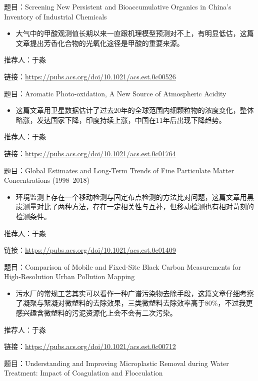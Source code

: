\documentclass[]{book}
\providecommand{\tightlist}{%
  \setlength{\itemsep}{0pt}\setlength{\parskip}{0pt}}
\begin{document}
题目：Screening New Persistent and Bioaccumulative Organics in China's Inventory of Industrial Chemicals

\begin{itemize}
\tightlist
\item
  大气中的甲酸观测值长期以来一直跟机理模型预测对不上，有明显低估，这篇文章提出芳香化合物的光氧化途径是甲酸的重要来源。
\end{itemize}

推荐人：于淼

链接：\url{https://pubs.acs.org/doi/10.1021/acs.est.0c00526}

题目：Aromatic Photo-oxidation, A New Source of Atmospheric Acidity

\begin{itemize}
\tightlist
\item
  这篇文章用卫星数据估计了过去20年的全球范围内细颗粒物的浓度变化，整体略涨，发达国家下降，印度持续上涨，中国在11年后出现下降趋势。
\end{itemize}

推荐人：于淼

链接：\url{https://pubs.acs.org/doi/10.1021/acs.est.0c01764}

题目：Global Estimates and Long-Term Trends of Fine Particulate Matter Concentrations (1998--2018)

\begin{itemize}
\tightlist
\item
  环境监测上存在一个移动检测与固定布点检测的方法比对问题，这篇文章用黑炭测量对比了两种方法，存在一定相关性与互补，但移动检测也有相对苛刻的检测条件。
\end{itemize}

推荐人：于淼

链接：\url{https://pubs.acs.org/doi/10.1021/acs.est.0c01409}

题目：Comparison of Mobile and Fixed-Site Black Carbon Measurements for High-Resolution Urban Pollution Mapping

\begin{itemize}
\tightlist
\item
  污水厂的常规工艺其实可以看作一种广谱污染物去除手段，这篇文章仔细考察了凝聚与絮凝对微塑料的去除效果，三类微塑料去除效率高于80\%，不过我更感兴趣含微塑料的污泥资源化上会不会有二次污染。
\end{itemize}

推荐人：于淼

链接：\url{https://pubs.acs.org/doi/10.1021/acs.est.0c00712}

题目：Understanding and Improving Microplastic Removal during Water Treatment: Impact of Coagulation and Flocculation
\end{document}
